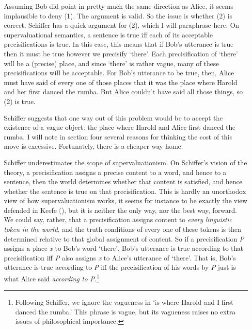 \documentclass[
  10pt,
  letterpaper,
  DIV=11,
  numbers=noendperiod,
  twoside]{scrartcl}
\begin{document}
Assuming Bob did point in pretty much the same direction as Alice, it
seems implausible to deny (1). The argument is valid. So the issue is
whether (2) is correct. Schiffer has a quick argument for (2), which I
will paraphrase here. On supervaluational semantics, a sentence is true
iff each of its acceptable precisifications is true. In this case, this
means that if Bob's utterance is true then it must be true however we
precisify `there'. Each precisification of `there' will be a (precise)
place, and since `there' is rather vague, many of these precisifications
will be acceptable. For Bob's utterance to be true, then, Alice must
have said of every one of those places that it was the place where
Harold and her first danced the rumba. But Alice couldn't have said all
those things, so (2) is true.

Schiffer suggests that one way out of this problem would be to accept
the existence of a vague object: the place where Harold and Alice first
danced the rumba. I will note in section four several reasons for
thinking the cost of this move is excessive. Fortunately, there is a
cheaper way home.

Schiffer underestimates the scope of supervaluationism. On Schiffer's
vision of the theory, a precisification assigns a precise content to a
word, and hence to a sentence, then the world determines whether that
content is satisfied, and hence whether the sentence is true on that
precisification. This is hardly an unorthodox view of how
supervaluationism works, it seems for instance to be exactly the view
defended in Keefe (), but it is neither
the only way, nor the best way, forward. We could say, rather, that a
precisification assigns content to \emph{every linguistic token in the
world}, and the truth conditions of every one of these tokens is then
determined relative to that global assignment of content. So if a
precisification \emph{P} assigns a place \emph{x} to Bob's word `there',
Bob's utterance is true according to that precisification iff \emph{P}
also assigns \emph{x} to Alice's utterance of `there'. That is, Bob's
utterance is true according to \emph{P} iff the precisification of his
words by \emph{P} just is what Alice said \emph{according to
P}.\footnote{Following Schiffer, we ignore the vagueness in `is where
  Harold and I first danced the rumba.' This phrase is vague, but its
  vagueness raises no extra issues of philosophical importance.}
\end{document}
